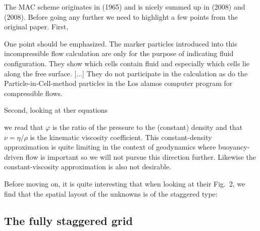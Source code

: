 The MAC scheme originates in \textcite{hawe65} (1965) and is nicely
summed up in \textcite{kans08} (2008) and \textcite{mctf08} (2008).
Before going any further we need to highlight a few points from the original paper.
First, 
\begin{displayquote}
{\color{darkgray}
One point should be emphasized. The marker particles introduced into 
this incompressible flow calculation are only for the purpose 
of indicating fluid configuration. They show which cells contain fluid
and especially which cells lie along the free surface. [...]
They do not participate in the calculation as do the Particle-in-Cell-method
particles in the Los alamos computer program for compressible flows.
}
\end{displayquote}
Second, looking at ther equations
\begin{center}
\end{center}
we read that $\varphi$ is the ratio of the pressure to the (constant) density
and that $\nu=\eta/\rho$ is the kinematic viscosity coefficient. 
This constant-density approximation is quite limiting in the context 
of geodynamics where buoyancy-driven flow is important so 
we will not pursue this direction further. Likewise the constant-viscosity
approximation is also not desirable.

Before moving on, it is quite interesting that 
when looking at their Fig.~2, we find that the spatial 
layout of the unknowns is of the staggered type:
\begin{center}
\end{center}



\subsection{The fully staggered grid}

